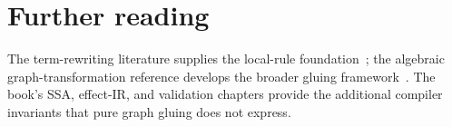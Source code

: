\section{Further reading}
\label{sec:ch87-reading}
The term-rewriting literature supplies the local-rule foundation~\cite{ohlebusch-2002-rewriting}; the algebraic graph-transformation reference develops the broader gluing framework~\cite{graphtransformation-2006-fundamentals}.
The book's SSA, effect-IR, and validation chapters provide the additional compiler invariants that pure graph gluing does not express.
